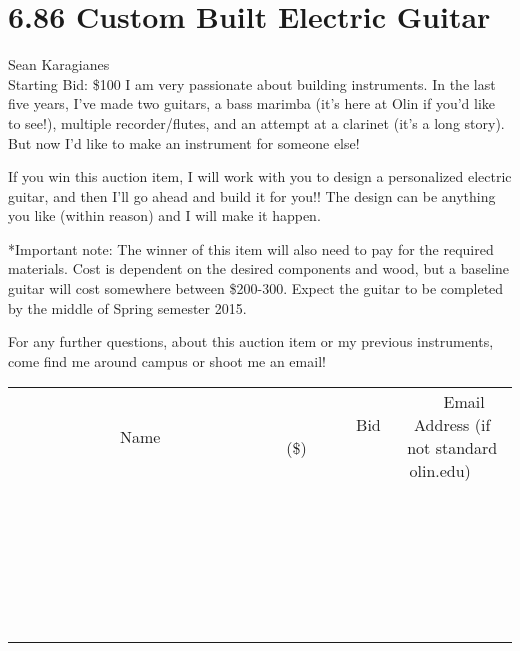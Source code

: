 \documentclass[11pt]{article}
\begin{document}
\section*{6.86 Custom Built Electric Guitar}
Sean Karagianes
\\
Starting Bid: \$100
\newline
I am very passionate about building instruments. In the last five years, I've made two guitars, a bass marimba (it's here at Olin if you'd like to see!), multiple recorder/flutes, and an attempt at a clarinet (it's a long story). But now I'd like to make an instrument for someone else!

If you win this auction item, I will work with you to design a personalized electric guitar, and then I'll go ahead and build it for you!! The design can be anything you like (within reason) and I will make it happen. 

*Important note: The winner of this item will also need to pay for the required materials. Cost is dependent on the desired components and wood, but a baseline guitar will cost somewhere between \$200-300. Expect the guitar to be completed by the middle of Spring semester 2015.

For any further questions, about this auction item or my previous instruments, come find me around campus or shoot me an email!
\\[6ex]
\begin{tabular}{c c c}
~~~~~~~~~~~~~Name~~~~~~~~~~~~~ & ~~~~~~~~~Bid (\$)~~~~~~~~~  & ~~~Email Address (if not standard olin.edu)~~~\\
 & & \\
\hline
 & & \\
\hline
 & & \\
\hline
 & & \\
\hline
 & & \\
\hline
 & & \\
\hline
 & & \\
\hline
 & & \\
\hline
 & & \\
\hline
 & & \\
\hline
 & & \\
\hline
 & & \\
\hline
 & & \\
\hline
 & & \\
\hline
 & & \\
\hline
 & & \\
\hline
 & & \\
\hline
 & & \\
\hline
 & & \\
\hline
 & & \\
\hline
 & & \\
\hline
 & & \\
\hline
 & & \\
\hline
 & & \\
\hline
 & & \\
\hline
 & & \\
\hline
\end{tabular}
\newpage
\end{document}
